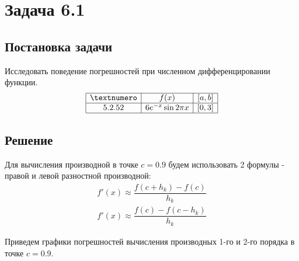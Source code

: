 \section*{Задача 6.1}
\subsection*{Постановка задачи}
Исследовать поведение погрешностей при численном дифференцировании функции.
\[
\begin{array}{| c | c | c |}
	\hline
	№ & f(x) & [a, b] \\ \hline
	5.2.52 & 6e^{-x}\sin{2\pi x} & [0, 3] \\ \hline
\end{array}
\]
\subsection*{Решение}
Для вычисления производной в точке $c = 0.9$ будем использовать 2 формулы - правой и левой разностной производной:
\begin{gather}
	f'(x) \approx \dfrac{f(c + h_k) - f(c)}{h_k}\\
	f'(x) \approx \dfrac{f(c) - f(c - h_k)}{h_k}
\end{gather}

Приведем графики погрешностей вычисления производных 1-го и 2-го порядка в точке $c = 0.9$.

